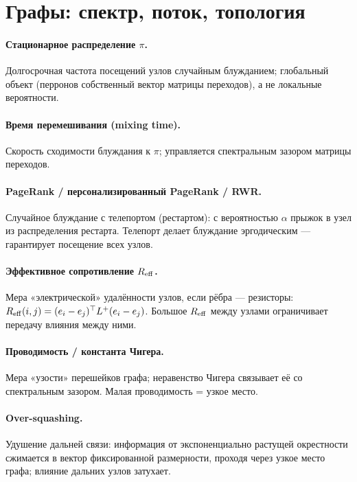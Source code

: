 \section*{Графы: спектр, поток, топология}

\paragraph{Стационарное распределение $\pi$.} Долгосрочная частота посещений узлов
случайным блужданием; глобальный объект (перронов собственный вектор матрицы
переходов), а не локальные вероятности.

\paragraph{Время перемешивания (mixing time).} Скорость сходимости блуждания к
$\pi$; управляется спектральным зазором матрицы переходов.

\paragraph{PageRank / персонализированный PageRank / RWR.} Случайное блуждание с
телепортом (рестартом): с вероятностью $\alpha$ прыжок в узел из распределения
рестарта. Телепорт делает блуждание эргодическим — гарантирует посещение всех
узлов.

\paragraph{Эффективное сопротивление $R_{\mathrm{eff}}$.} Мера «электрической» удалённости
узлов, если рёбра — резисторы: $R_{\mathrm{eff}}(i,j)=(e_i-e_j)^\top L^{+}(e_i-e_j)$. Большое
$R_{\mathrm{eff}}$ между узлами ограничивает передачу влияния между ними.

\paragraph{Проводимость / константа Чигера.} Мера «узости» перешейков графа;
неравенство Чигера связывает её со спектральным зазором. Малая проводимость = узкое
место.

\paragraph{Over-squashing.} Удушение дальней связи: информация от экспоненциально
растущей окрестности сжимается в вектор фиксированной размерности, проходя через
узкое место графа; влияние дальних узлов затухает.

